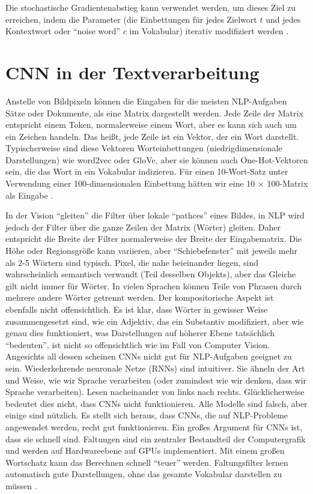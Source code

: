 Die stochastische Gradientenabstieg kann verwendet werden, um dieses Ziel zu erreichen, indem die Parameter (die Einbettungen für jedes Zielwort $t$ und jedes Kontextwort oder \enquote{noise word} $c$ im Vokabular) iterativ modifiziert werden \cite*[114]{Jurafskya}.


\section{CNN in der Textverarbeitung}
Anstelle von Bildpixeln können die Eingaben für die meisten NLP-Aufgaben Sätze oder Dokumente, als eine Matrix dargestellt werden. Jede Zeile der Matrix entspricht einem Token, normalerweise einem Wort, aber es kann sich auch um ein Zeichen handeln. Das heißt, jede Zeile ist ein Vektor, der ein Wort darstellt. Typischerweise sind diese Vektoren Worteinbettungen (niedrigdimensionale Darstellungen) wie word2vec oder GloVe, aber sie können auch One-Hot-Vektoren sein, die das Wort in ein Vokabular indizieren. Für einen 10-Wort-Satz unter Verwendung einer 100-dimensionalen Einbettung hätten wir eine 10 × 100-Matrix als Eingabe \cite*{Zhang}.

In der Vision \enquote{gleiten} die Filter über lokale \enquote{pathces} eines Bildes, in NLP wird jedoch der Filter über die ganze Zeilen der Matrix (Wörter) gleiten. Daher entspricht die Breite der Filter normalerweise der Breite der Eingabematrix. Die Höhe oder Regionsgröße kann variieren, aber \enquote{Schiebefenster} mit jeweils mehr als 2-5 Wörtern sind typisch. Pixel, die nahe beieinander liegen, sind wahrscheinlich semantisch verwandt (Teil desselben Objekts), aber das Gleiche gilt nicht immer für Wörter. In vielen Sprachen können Teile von Phrasen durch mehrere andere Wörter getrennt werden. Der kompositorische Aspekt ist ebenfalls nicht offensichtlich. Es ist klar, dass Wörter in gewisser Weise zusammengesetzt sind, wie ein Adjektiv, das ein Substantiv modifiziert, aber wie genau dies funktioniert, was Darstellungen auf höherer Ebene tatsächlich \enquote{bedeuten}, ist nicht so offensichtlich wie im Fall von Computer Vision. Angesichts all dessen scheinen CNNs nicht gut für NLP-Aufgaben geeignet zu sein. Wiederkehrende neuronale Netze (RNNs) sind intuitiver. Sie ähneln der Art und Weise, wie wir Sprache verarbeiten (oder zumindest wie wir denken, dass wir Sprache verarbeiten). Lesen nacheinander von links nach rechts. Glücklicherweise bedeutet dies nicht, dass CNNs nicht funktionieren. Alle Modelle sind falsch, aber einige sind nützlich. Es stellt sich heraus, dass CNNs, die auf NLP-Probleme angewendet werden, recht gut funktionieren. Ein großes Argument für CNNs ist, dass sie schnell sind. Faltungen sind ein zentraler Bestandteil der Computergrafik und werden auf Hardwareebene auf GPUs implementiert. Mit einem großen Wortschatz kann das Berechnen schnell \enquote{teuer} werden. Faltungsfilter lernen automatisch gute Darstellungen, ohne das gesamte Vokabular darstellen zu müssen \cite*{widlml}.

